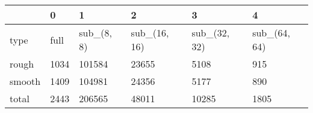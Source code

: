 \begin{tabular}{llllll}
\toprule
{} &     0 &           1 &             2 &             3 &             4 \\
\midrule
type   &  full &  sub\_(8, 8) &  sub\_(16, 16) &  sub\_(32, 32) &  sub\_(64, 64) \\
rough  &  1034 &      101584 &         23655 &          5108 &           915 \\
smooth &  1409 &      104981 &         24356 &          5177 &           890 \\
total  &  2443 &      206565 &         48011 &         10285 &          1805 \\
\bottomrule
\end{tabular}

